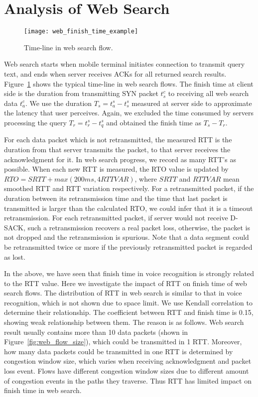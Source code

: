 
\section{Analysis of Web Search}
\label{sec:web_search}

\begin{figure}[th]
\centering
	\texttt{[image: web\_finish\_time\_example]}
\caption{Time-line in web search flow.}
\label{fig:web_finish_time_example}
\end{figure}

Web search starts when mobile terminal initiates connection to transmit query text, and ends when server receives ACKs for all returned search results. Figure~\ref{fig:web_finish_time_example} shows the typical time-line in web search flows. The finish time at client side is the duration from transmitting SYN packet $t^c_s$ to receiving all web search data $t^c_a$. We use the duration $T_s=t^s_a - t^s_s$ measured at server side to approximate the latency that user perceives. Again, we excluded the time consumed by servers processing the query $T_r=t^s_r - t^s_q$ and obtained the finish time as $T_s-T_r$.

For each data packet which is not retransmitted, the measured RTT is the duration from that server transmits the packet, to that server receives the acknowledgment for it. In web search progress, we record as many RTT's as possible. When each new RTT is measured, the RTO value is updated by $RTO = SRTT + max(200ms, 4 RTTVAR)$, where $SRTT$ and $RTTVAR$ mean smoothed RTT and RTT variation respectively. For a retransmitted packet, if the duration between its retransmission time and the time that last packet is transmitted is larger than the calculated RTO, we could infer that it is a timeout retransmission. For each retransmitted packet, if server would not receive D-SACK, such a retransmission recovers a real packet loss, otherwise, the packet is not dropped and the retransmission is spurious. Note that a data segment could be retransmitted twice or more if the previously retransmitted packet is regarded as lost.

In the above, we have seen that finish time in voice recognition is strongly related to the RTT value. Here we investigate the impact of RTT on finish time of web search flows. The distribution of RTT in web search is similar to that in voice recognition, which is not shown due to space limit. We use Kendall correlation to determine their relationship. The coefficient between RTT and finish time is 0.15, showing weak relationship between them. The reason is as follows. Web search result usually contains more than 10 data packets (shown in Figure~\ref{fig:web_flow_size}), which could be transmitted in 1 RTT. Moreover, how many data packets could be transmitted in one RTT is determined by congestion window size, which varies when receiving acknowledgment and packet loss event. Flows have different congestion window sizes due to different amount of congestion events in the paths they traverse. Thus RTT has limited impact on finish time in web search. 


